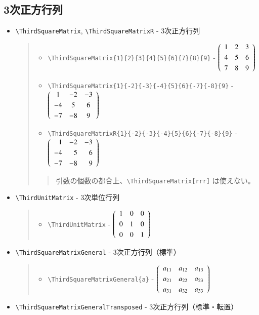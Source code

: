 \documentclass[oneside,10pt,a4paper]{jsarticle}
\begin{document}
  \newpage

  \subsection{3次正方行列}

  \begin{itemize}
    \item \verb|\ThirdSquareMatrix|, \verb|\ThirdSquareMatrixR| - 3次正方行列
      \begin{quote}
        \Example
        \begin{itemize}
          \item \verb|\ThirdSquareMatrix{1}{2}{3}{4}{5}{6}{7}{8}{9}| - $\ThirdSquareMatrix{1}{2}{3}{4}{5}{6}{7}{8}{9}$
          \item \verb|\ThirdSquareMatrix{1}{-2}{-3}{-4}{5}{6}{-7}{-8}{9}| - $\ThirdSquareMatrix{1}{-2}{-3}{-4}{5}{6}{-7}{-8}{9}$
          \item \verb|\ThirdSquareMatrixR{1}{-2}{-3}{-4}{5}{6}{-7}{-8}{9}| - $\ThirdSquareMatrixR{1}{-2}{-3}{-4}{5}{6}{-7}{-8}{9}$
        \end{itemize}
        \Remark
        \begin{quote}
          引数の個数の都合上、\verb|\ThirdSquareMatrix[rrr]| は使えない。
        \end{quote}
      \end{quote}
    \item \verb|\ThirdUnitMatrix| - 3次単位行列
      \begin{quote}
        \Example
        \begin{itemize}
          \item \verb|\ThirdUnitMatrix| - $\ThirdUnitMatrix$
        \end{itemize}
      \end{quote}
    \item \verb|\ThirdSquareMatrixGeneral| - 3次正方行列（標準）
      \begin{quote}
        \Example
        \begin{itemize}
          \item \verb|\ThirdSquareMatrixGeneral{a}| - $\ThirdSquareMatrixGeneral{a}$
        \end{itemize}
      \end{quote}
    \item \verb|\ThirdSquareMatrixGeneralTransposed| - 3次正方行列（標準・転置）
      \begin{quote}
        \Example
        \begin{itemize}

\end{itemize}
\end{quote}
\end{itemize}
\end{document}
